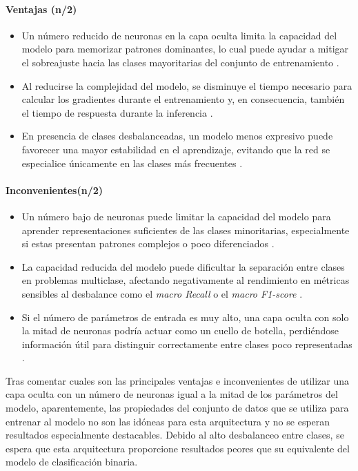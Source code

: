 \paragraph{Ventajas (n/2)}
\begin{itemize}
	\item Un número reducido de neuronas en la capa oculta limita la capacidad del modelo para memorizar patrones dominantes, lo cual puede ayudar a mitigar el sobreajuste hacia las clases mayoritarias del conjunto de entrenamiento \cite{zhang2016understanding}.
	\item Al reducirse la complejidad del modelo, se disminuye el tiempo necesario para calcular los gradientes durante el entrenamiento y, en consecuencia, también el tiempo de respuesta durante la inferencia \cite{han2015learning}.
	\item En presencia de clases desbalanceadas, un modelo menos expresivo puede favorecer una mayor estabilidad en el aprendizaje, evitando que la red se especialice únicamente en las clases más frecuentes \cite{he2009learning}.

\end{itemize}
\paragraph{Inconvenientes(n/2)}
\begin{itemize}
	\item Un número bajo de neuronas puede limitar la capacidad del modelo para aprender representaciones suficientes de las clases minoritarias, especialmente si estas presentan patrones complejos o poco diferenciados \cite{chawla2004editorial}.
	\item La capacidad reducida del modelo puede dificultar la separación entre clases en problemas multiclase, afectando negativamente al rendimiento en métricas sensibles al desbalance como el \textit{macro Recall} o el \textit{macro F1-score} \cite{he2009learning}.
	\item Si el número de parámetros de entrada es muy alto, una capa oculta con solo la mitad de neuronas podría actuar como un cuello de botella, perdiéndose información útil para distinguir correctamente entre clases poco representadas \cite{goodfellow2016deep}.

\end{itemize}

Tras comentar cuales son las principales ventajas e inconvenientes de utilizar una capa oculta con un número de neuronas igual a la mitad de los parámetros del modelo, aparentemente, las propiedades del conjunto de datos que se utiliza para entrenar al modelo no son las idóneas para esta arquitectura y no se esperan resultados especialmente destacables. Debido al alto desbalanceo entre clases, se espera que esta arquitectura proporcione resultados peores que su equivalente del modelo de clasificación binaria.

